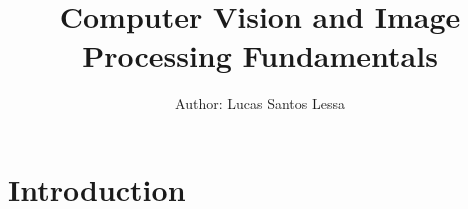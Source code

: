 \documentclass[journal]{IEEEtran}
\begin{document}
\title{Computer Vision and Image Processing Fundamentals}


\author{ Author: Lucas Santos Lessa}

\maketitle

\IEEEpeerreviewmaketitle

\section{Introduction}

\ifCLASSOPTIONcaptionsoff
  \newpage
\fi

\end{document}

